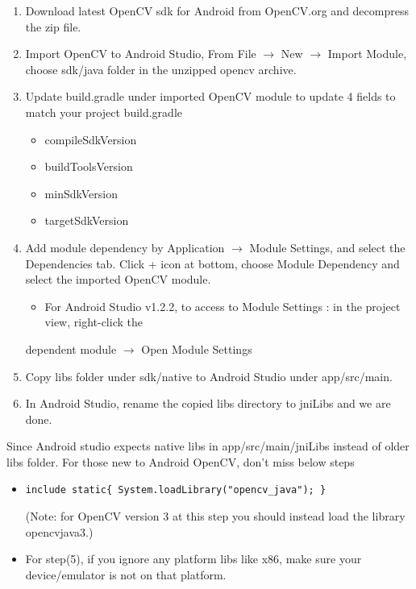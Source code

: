 \documentclass[10pt,a4paper]{article}
\begin{document}
\begin{enumerate}

	\item  Download latest OpenCV sdk for Android from OpenCV.org and decompress the zip file.
	\item Import OpenCV to Android Studio, From File $\rightarrow$ New $\rightarrow$ Import Module, choose sdk/java folder in the unzipped opencv archive.
	\item Update build.gradle under imported OpenCV module to update 4 fields to match your project build.gradle
	\begin{itemize}
		\item compileSdkVersion
		\item buildToolsVersion
		\item minSdkVersion
		\item targetSdkVersion
	\end{itemize}
	\item Add module dependency by Application $\rightarrow$ Module Settings, and select the Dependencies tab. Click + icon at bottom, choose Module Dependency and select the imported OpenCV module.\\
	
	\begin{itemize}
		\item For Android Studio v1.2.2, to access to Module Settings : in the project view, right-click the
	\end{itemize} dependent module $\rightarrow$ Open Module Settings
	\item  Copy libs folder under sdk/native to Android Studio under app/src/main.
	\item In Android Studio, rename the copied libs directory to jniLibs and we are done.
\end{enumerate}
Since Android studio expects native libs in app/src/main/jniLibs instead of older libs folder. For those new to Android OpenCV, don't miss below steps
    
\begin{itemize}
	\item 
		\begin{lstlisting}
include static{ System.loadLibrary("opencv_java"); }
		\end{lstlisting}
		(Note: for OpenCV version 3 at this step you should instead load the library opencvjava3.)
	\item For step(5), if you ignore any platform libs like x86, make sure your device/emulator is not on that platform.
\end{itemize}
\end{document}
